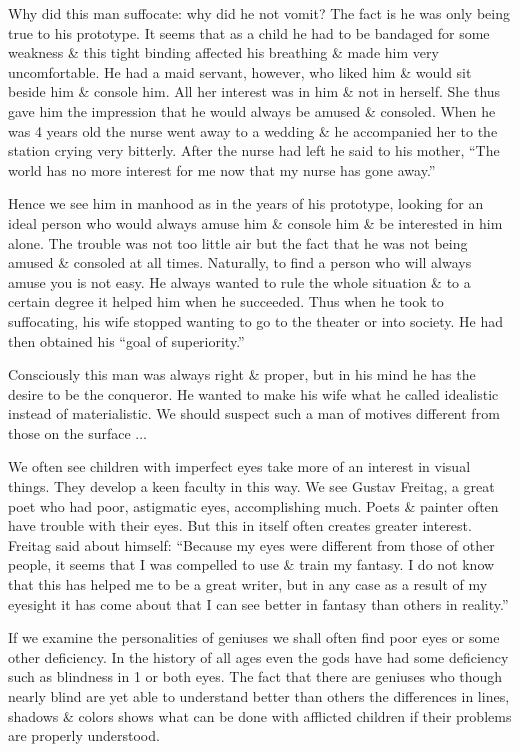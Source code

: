 \documentclass{article}
\begin{document}
Why did this man suffocate: why did he not vomit? The fact is he was only being true to his prototype. It seems that as a child he had to be bandaged for some weakness \& this tight binding affected his breathing \& made him very uncomfortable. He had a maid servant, however, who liked him \& would sit beside him \& console him. All her interest was in him \& not in herself. She thus gave him the impression that he would always be amused \& consoled. When he was 4 years old the nurse went away to a wedding \& he accompanied her to the station crying very bitterly. After the nurse had left he said to his mother, ``The world has no more interest for me now that my nurse has gone away.''

Hence we see him in manhood as in the years of his prototype, looking for an ideal person who would always amuse him \& console him \& be interested in him alone. The trouble was not too little air but the fact that he was not being amused \& consoled at all times. Naturally, to find a person who will always amuse you is not easy. He always wanted to rule the whole situation \& to a certain degree it helped him when he succeeded. Thus when he took to suffocating, his wife stopped wanting to go to the theater or into society. He had then obtained his ``goal of superiority.''

Consciously this man was always right \& proper, but in his mind he has the desire to be the conqueror. He wanted to make his wife what he called idealistic instead of materialistic. We should suspect such a man of motives different from those on the surface $\ldots$

We often see children with imperfect eyes take more of an interest in visual things. They develop a keen faculty in this way. We see Gustav Freitag, a great poet who had poor, astigmatic eyes, accomplishing much. Poets  \& painter often have trouble with their eyes. But this in itself often creates greater interest. Freitag said about himself: ``Because my eyes were different from those of other people, it seems that I was compelled to use \& train my fantasy. I do not know that this has helped me to be a great writer, but in any case as a result of my eyesight it has come about that I can see better in fantasy than others in reality.''

If we examine the personalities of geniuses we shall often find poor eyes or some other deficiency. In the history of all ages even the gods have had some deficiency such as blindness in 1 or both eyes. The fact that there are geniuses who though nearly blind are yet able to understand better than others the differences in lines, shadows \& colors shows what can be done with afflicted children if their problems are properly understood.
\end{document}
